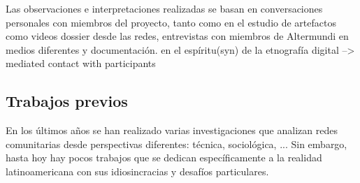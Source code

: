 Las observaciones e interpretaciones realizadas se basan en conversaciones personales con miembros del proyecto, tanto como en el estudio de artefactos como videos dossier desde las redes, entrevistas con miembros de Altermundi en medios diferentes y documentación.
en el espíritu(syn) de la etnografía digital --> mediated contact with participants

\begin{comment}
[PHPHLT2016]

"In digital ethnography, we are often in mediated contact with participants rather than in direct presence." --> das trifft bei mir zu
"We might be
watching what people do by digitally tracking them, or asking them to invite us into
their social media practices. Listening may involve reading, or it might involve sens-
ing and communicating in other ways. Ethnographic writing might be replaced by
video, photography or blogging."

"As new technologies offer new ways of engaging with emergent research
environments, our actual practices as ethnographers also shift." --> man kann darüber meta reflektieren, welche konsequenzen das für meine arbeit hat

"how inequality is extended, reproduced or complicated by digital media technologies" --> kann leider nicht befriedigend beurteilen aus der ferne, aber ich würde eher für das gegenteil argumentieren beim projekt: es ist ein versuch, the digital devide zu schließen (bridging the digital devide);

In wie fern ist meine Arbeit digital ethnography:
der Aspekt trifft zu:
"how people are using digital media, technologies and tools;"
and to a lesser extent:
"fourth, engaging in critical analysis of the use and consequences of digital media."

"we are interested in how the digital has become
part of the material, sensory and social worlds we inhabit,"
--> denk an Routern und Anthennen im phys. Raum --> Videos vom Anthennenaufbau
\end{comment}

\subsection{Trabajos previos}

En los últimos años se han realizado varias investigaciones que analizan redes comunitarias desde perspectivas diferentes: técnica, sociológica, ...
Sin embargo, hasta hoy hay pocos trabajos que se dedican específicamente a la realidad latinoamericana con sus idiosincracias y desafíos particulares.

